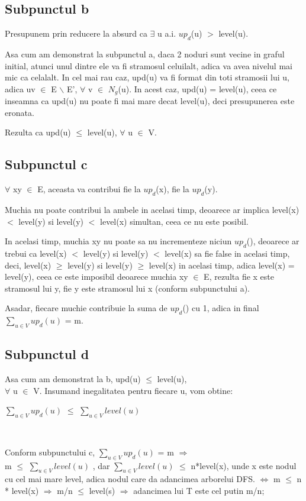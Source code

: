 \documentclass{article}
\begin{document}
\subsection*{\fontsize{16}{30}\selectfont Subpunctul b}
{\fontsize{14}{16}\selectfont
Presupunem prin reducere la absurd ca $\exists$ u a.i. $up_d$(u) $>$ level(u). 
\par Asa cum am demonstrat la subpunctul a, daca 2 noduri sunt vecine in graful initial, atunci unul dintre ele va fi stramosul celuilalt, adica va avea nivelul mai mic ca celalalt.  In cel mai rau caz, upd(u) va fi format din toti stramosii lui u, adica uv $\in$ E $\backslash$ E', $\forall$ v $\in$ $N_g$(u). In acest caz, upd(u) = level(u), ceea ce inseamna ca upd(u) nu poate fi mai mare decat level(u), deci presupunerea este eronata.
\par Rezulta ca upd(u) $\le$ level(u), $\forall$ u $\in$ V. 
}

\subsection*{\fontsize{16}{30}\selectfont Subpunctul c}
{\fontsize{14}{16}\selectfont
$\forall$ xy $\in$ E, aceasta va contribui fie la $up_d$(x), fie la $up_d$(y).
\par Muchia nu poate contribui la ambele in acelasi timp, deoarece ar implica level(x) $<$ level(y) si level(y) $<$ level(x) simultan, ceea ce nu este posibil. 
\par In acelasi timp, muchia xy nu poate sa nu incrementeze niciun $up_d$(), deoarece ar trebui ca level(x) $<$ level(y) si level(y) $<$ level(x) sa fie false in acelasi timp, deci, level(x) $\ge$ level(y) si level(y) $\ge$ level(x) in acelasi timp, adica level(x) = level(y), ceea ce este imposibil deoarece muchia xy $\in$ E, rezulta fie x este stramosul lui y, fie y este stramosul lui x (conform subpunctului a).
\par Asadar, fiecare muchie contribuie la suma de $up_d$() cu 1, adica in final $\sum_{u \in V} {up}_d(u)$
 = m.
}

\subsection*{\fontsize{16}{30}\selectfont Subpunctul d}
{\fontsize{14}{16}\selectfont
Asa cum am demonstrat la b, upd(u) $\le$ level(u), \\ $\forall$ u $\in$ V. Insumand inegalitatea pentru fiecare u, vom obtine:  \\
 \centerline {$\sum_{u \in V} {up}_d(u)$ $\le$ $\sum_{u \in V} {level(u)}$ } \\
 \par Conform subpunctului c, $\sum_{u \in V} {up}_d(u)$ = m $\Rightarrow$ \\ m $\le$ $\sum_{u \in V} {level(u)}$ , dar $\sum_{u \in V} {level(u)}$ $\le$ n*level(x), unde x este nodul cu cel mai mare level, adica nodul care da adancimea arborelui DFS. $\Leftrightarrow$ m $\le$ n * level(x) $\Rightarrow$ m/n $\le$ level(s) $\Rightarrow$ adancimea lui T este cel putin m/n; 
}
\end{document}
